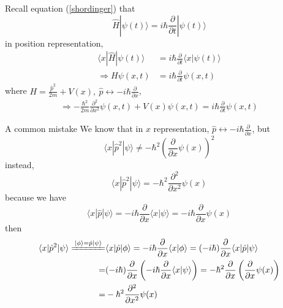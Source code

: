 \documentclass[UTF8,12pt]{article} %
\numberwithin{equation}{section}
\begin{document}
Recall equation (\ref{shordinger}) that
$$\hat{H}|\psi(t)\rangle = i\hbar\frac{\partial}{\partial t}|\psi(t)\rangle$$
in position representation,
\begin{align}
\langle x|\hat{H}|\psi(t)\rangle &= i\hbar\frac{\partial}{\partial t}\langle x|\psi(t)\rangle \\
\Rightarrow H\psi(x,t) &= i\hbar\frac{\partial}{\partial t}\psi(x,t)
\end{align}
where $H = \frac{\hat{p}^{2}}{2m} + V(x),~ \hat{p} \leftrightarrow -i\hbar\frac{\partial}{\partial x}$,
\begin{align}\label{sex}
\Rightarrow \boxed{-\frac{\hbar^{2}}{2m}\frac{\partial^{2}}{\partial x^{2}}\psi(x,t) + V(x)\psi(x,t) = i\hbar\frac{\partial}{\partial t}\psi(x,t)}
\end{align}

\begin{myboxes}{A common mistake}{}
We know that in $x$ representation, $\hat{p} \leftrightarrow -i\hbar\frac{\partial}{\partial x}$, but
$$\langle x|\hat{p}^{2}|\psi\rangle \ne -\hbar^{2}\left(\frac{\partial}{\partial x} \psi(x)\right)^{2}$$
instead, 
$$\boxed{\langle x|\hat{p}^{2}|\psi\rangle = -\hbar^{2}\frac{\partial^{2}}{\partial x^{2}}\psi(x)}$$
because we have
$$\langle x|\hat{p}|\psi\rangle = -i\hbar\frac{\partial}{\partial x}\langle x|\psi\rangle = -i\hbar\frac{\partial}{\partial x}\psi(x)$$
then
\begin{align*}
\langle x|\hat{p}^{2}|\psi\rangle \xlongequal{|\phi\rangle = \hat{p}|\psi\rangle}& \langle x|\hat{p}|\phi\rangle =  -i\hbar\frac{\partial}{\partial x}\langle x|\phi\rangle = (-i\hbar)\frac{\partial}{\partial x}\langle x|\hat{p}|\psi\rangle \\
=& (-i\hbar)\frac{\partial}{\partial x}\left(-i\hbar\frac{\partial}{\partial x}\langle x|\psi\rangle\right) = -\hbar^{2}\frac{\partial}{\partial x}\left(\frac{\partial}{\partial x}\psi(x)\right) \\
=& -\hbar^{2}\frac{\partial^{2}}{\partial x^{2}}\psi(x)
\end{align*}
\end{myboxes}
\end{document}
